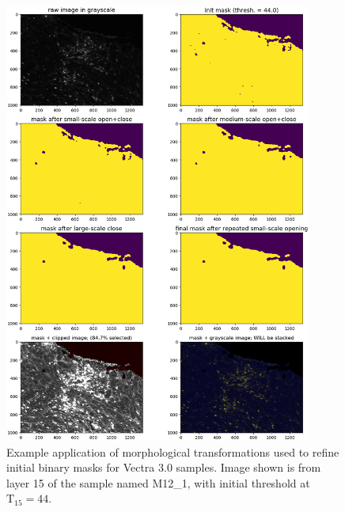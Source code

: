 \documentclass[letterpaper,11pt]{article}
\newcommand{\Tau}{\mathrm{T}}
\begin{document}
\begin{figure}[!ht]
\centering
\includegraphics[width=0.9\textwidth]{images/masking/image_383_layer_15_masks}
\caption{\footnotesize Example application of morphological transformations used to refine initial binary masks for Vectra 3.0 samples. Image shown is from layer 15 of the sample named M12\_1, with initial threshold at $\Tau_{15}=44$.}
\label{fig:mask_example_vectra_med}
\end{figure}
\end{document}
